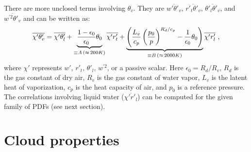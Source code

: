\documentclass[11pt,fleqn]{article}
\begin{document}
There are more unclosed terms involving $\theta_v$. They are
$\overline{w'\theta'_v}$, $\overline{r'_t\theta'_v}$,
$\overline{\theta'_l\theta'_v}$, and $\overline{w^{'2}\theta'_v}$ and can be
written as:
%
\begin{equation}
\overline{\chi'\theta'_v} 
= \overline{\chi'\theta'_l} 
+ \underbrace{ \frac{1-\epsilon_0}{\epsilon_0} \theta_0 
             }_{\equiv A \, (\approx \, 200 K)}
  \overline{\chi'r'_t}
+ \underbrace{
   \left( 
     \frac{L_v}{c_p} \left( \frac{p_0}{p} \right)^{R_d/c_p}      
     - \frac{1}{\epsilon_0}\theta_0
   \right) }_{\equiv B \, (\approx \, 2000 K)}
  \overline{\chi'r'_l} \hbox{ ,}
\end{equation}
% 
where $\chi'$ represents $w'$, $r'_t$, $\theta'_l$,  $w^{'2}$, or
a passive scalar.
Here $\epsilon_0 = R_d/R_v$, $R_d$ is the gas constant of dry air, 
$R_v$ is the gas constant of water vapor, $L_v$ is the latent heat 
of vaporization, $c_p$ is the heat capacity of air, 
and $p_0$ is a reference pressure. The correlations involving
liquid water ($\overline{\chi'r'_l}$) can be computed for the given
family of PDFs (see next section).

\section{Cloud properties}
\end{document}
